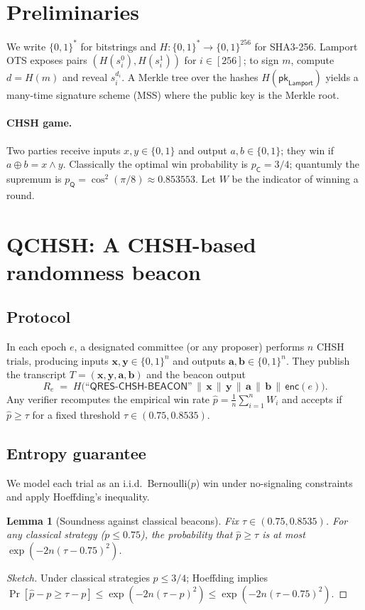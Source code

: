 \documentclass[11pt]{article}
\newtheorem{lemma}{Lemma}
\begin{document}
\section{Preliminaries}
We write $\{0,1\}^*$ for bitstrings and $H:\{0,1\}^*\to\{0,1\}^{256}$ for SHA3-256.
Lamport OTS exposes pairs $(H(s_i^0), H(s_i^1))$ for $i\in[256]$; to sign $m$, compute $d=H(m)$ and reveal $s_i^{d_i}$.
A Merkle tree over the hashes $H(\textsf{pk}_\textsf{Lamport})$ yields a many-time signature scheme (MSS) where the public key is the Merkle root.

\paragraph{CHSH game.}
Two parties receive inputs $x,y\in\{0,1\}$ and output $a,b\in\{0,1\}$; they win if $a\oplus b = x\wedge y$.
Classically the optimal win probability is $p_\mathsf{C}=3/4$; quantumly the supremum is $p_\mathsf{Q}=\cos^2(\pi/8)\approx0.853553$.
Let $W$ be the indicator of winning a round.

\section{QCHSH: A CHSH-based randomness beacon}
\subsection{Protocol}
In each epoch $e$, a designated committee (or any proposer) performs $n$ CHSH trials, producing inputs $\mathbf{x},\mathbf{y}\in\{0,1\}^n$ and outputs $\mathbf{a},\mathbf{b}\in\{0,1\}^n$.
They publish the transcript $T=(\mathbf{x},\mathbf{y},\mathbf{a},\mathbf{b})$ and the beacon output
\[
R_e \;=\; H\big(\textsf{``QRES-CHSH-BEACON''}\,\|\,\mathbf{x}\,\|\,\mathbf{y}\,\|\,\mathbf{a}\,\|\,\mathbf{b}\,\|\,\textsf{enc}(e)\big).
\]
Any verifier recomputes the empirical win rate $\hat{p}=\frac{1}{n}\sum_{i=1}^n W_i$ and accepts if $\hat{p}\ge \tau$ for a fixed threshold $\tau\in(0.75, 0.8535)$.

\subsection{Entropy guarantee}
We model each trial as an i.i.d.\ Bernoulli($p$) win under no-signaling constraints and apply Hoeffding's inequality.
\begin{lemma}[Soundness against classical beacons]
\label{lem:sound}
Fix $\tau\in(0.75, 0.8535)$. For any classical strategy ($p\le 0.75$), the probability that $\hat{p}\ge\tau$ is at most $\exp(-2n(\tau-0.75)^2)$.
\end{lemma}
\begin{proof}[Sketch]
Under classical strategies $p\le 3/4$; Hoeffding implies
$\Pr[\hat{p}-p\ge \tau-p]\le \exp(-2n(\tau-p)^2)\le \exp(-2n(\tau-0.75)^2)$.
\end{proof}
\end{document}
